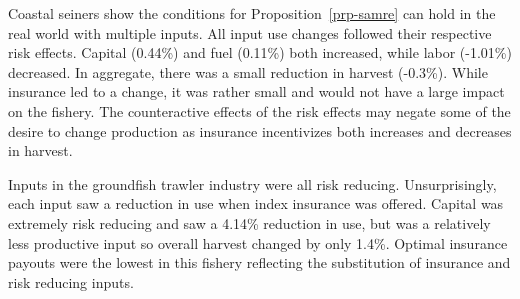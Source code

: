 \documentclass[
  letterpaper,
  DIV=11,
  numbers=noendperiod]{scrartcl}
\theoremstyle{plain}
\theoremstyle{plain}
\theoremstyle{remark}
\begin{document}
Coastal seiners show the conditions for Proposition~\ref{prp-samre} can
hold in the real world with multiple inputs. All input use changes
followed their respective risk effects. Capital (0.44\%) and fuel
(0.11\%) both increased, while labor (-1.01\%) decreased. In aggregate,
there was a small reduction in harvest (-0.3\%). While insurance led to
a change, it was rather small and would not have a large impact on the
fishery. The counteractive effects of the risk effects may negate some
of the desire to change production as insurance incentivizes both
increases and decreases in harvest.

Inputs in the groundfish trawler industry were all risk reducing.
Unsurprisingly, each input saw a reduction in use when index insurance
was offered. Capital was extremely risk reducing and saw a 4.14\%
reduction in use, but was a relatively less productive input so overall
harvest changed by only 1.4\%. Optimal insurance payouts were the lowest
in this fishery reflecting the substitution of insurance and risk
reducing inputs.
\end{document}
